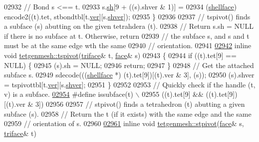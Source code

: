 \begin{DoxyCode}
02932   \textcolor{comment}{// Bond s <== t.}
02933   s.\hyperlink{classtetgenmesh_1_1face_a0ebac53728a624fcb6528a7d2571b987}{sh}[9 + ((s).shver & 1)] = 
02934     (\hyperlink{classtetgenmesh_ad4860123b88783b943fa6452e886a2cb}{shellface}) encode2((t).tet, stbondtbl[t.\hyperlink{classtetgenmesh_1_1triface_a2b2b1dc34da73125359d6db535d75f7c}{ver}][s.\hyperlink{classtetgenmesh_1_1face_a990a58ccf240d0d4197c2a923a1853d6}{shver}]);
02935 \}
02936 
02937 \textcolor{comment}{// tspivot() finds a subface (s) abutting on the given tetrahdera (t).}
02938 \textcolor{comment}{//   Return s.sh = NULL if there is no subface at t. Otherwise, return}
02939 \textcolor{comment}{//   the subface s, and s and t must be at the same edge wth the same}
02940 \textcolor{comment}{//   orientation.}
02941 
\hypertarget{tetgen_8h_source.tex_l02942}{}\hyperlink{classtetgenmesh_a9f17777c1c04712dfa0ac34e8fbd0a4a}{02942} \textcolor{keyword}{inline} \textcolor{keywordtype}{void} \hyperlink{classtetgenmesh_a9f17777c1c04712dfa0ac34e8fbd0a4a}{tetgenmesh::tspivot}(\hyperlink{classtetgenmesh_1_1triface}{triface}& t, \hyperlink{classtetgenmesh_1_1face}{face}& s) 
02943 \{
02944   \textcolor{keywordflow}{if} ((t).tet[9] == NULL) \{
02945     (s).sh = NULL;
02946     \textcolor{keywordflow}{return};
02947   \}
02948   \textcolor{comment}{// Get the attached subface s.}
02949   sdecode(((\hyperlink{classtetgenmesh_ad4860123b88783b943fa6452e886a2cb}{shellface} *) (t).tet[9])[(t).ver & 3], (s));
02950   (s).shver = tspivottbl[t.\hyperlink{classtetgenmesh_1_1triface_a2b2b1dc34da73125359d6db535d75f7c}{ver}][s.\hyperlink{classtetgenmesh_1_1face_a990a58ccf240d0d4197c2a923a1853d6}{shver}];
02951 \}
02952 
02953 \textcolor{comment}{// Quickly check if the handle (t, v) is a subface.}
\hypertarget{tetgen_8h_source.tex_l02954}{}\hyperlink{tetgen_8h_add6d2aab58ba8af94512c31fe9674581}{02954} \textcolor{preprocessor}{#define issubface(t) \(\backslash\)}
02955 \textcolor{preprocessor}{  ((t).tet[9] && ((t).tet[9])[(t).ver & 3])}
02956 
02957 \textcolor{comment}{// stpivot() finds a tetrahedron (t) abutting a given subface (s).}
02958 \textcolor{comment}{//   Return the t (if it exists) with the same edge and the same}
02959 \textcolor{comment}{//   orientation of s.}
02960 
\hypertarget{tetgen_8h_source.tex_l02961}{}\hyperlink{classtetgenmesh_a2d9e294c7e3eb0dc1e75d7972d6fd5cd}{02961} \textcolor{keyword}{inline} \textcolor{keywordtype}{void} \hyperlink{classtetgenmesh_a2d9e294c7e3eb0dc1e75d7972d6fd5cd}{tetgenmesh::stpivot}(\hyperlink{classtetgenmesh_1_1face}{face}& s, \hyperlink{classtetgenmesh_1_1triface}{triface}& t) 

\end{DoxyCode}
